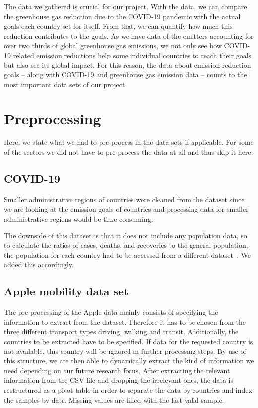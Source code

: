 The data we gathered is crucial for our project. With the data, we can compare the greenhouse gas reduction due to the COVID-19 pandemic with the actual goals each country set for itself. From that, we can quantify how much this reduction contributes to the goals. As we have data of the emitters accounting for over two thirds of global greenhouse gas emissions, we not only see how COVID-19 related emission reductions help some individual countries to reach their goals but also see its global impact. For this reason, the data about emission reduction goals -- along with COVID-19 and greenhouse gas emission data -- counts to the most important data sets of our project.

\newpage

\section*{Preprocessing}

Here, we state what we had to pre-process in the data sets if applicable. For some of the sectors we did not have to pre-process the data at all and thus skip it here.

\subsection*{COVID-19}
Smaller administrative regions of countries were cleaned from the dataset since we are looking at the emission goals of countries and processing data for smaller administrative regions would be time consuming.

The downside of this dataset is that it does not include any population data, so to calculate the ratios of cases, deaths, and recoveries to the general population, the population for each country had to be accessed from a different dataset~\cite{PopulationData}. We added this accordingly.

\subsection*{Apple mobility data set}
The pre-processing of the Apple data mainly consists of specifying the information to extract from the dataset. Therefore it has to be chosen from the three different transport types driving, walking and transit. Additionally, the countries to be extracted have to be specified. If data for the requested country is not available, this country will be ignored in further processing steps. By use of this structure, we are then able to dynamically extract the kind of information we need depending on our future research focus. After extracting the relevant information from the CSV file and dropping the irrelevant ones, the data is restructured as a pivot table in order to separate the data by countries and index the samples by date. Missing values are filled with the last valid sample.

